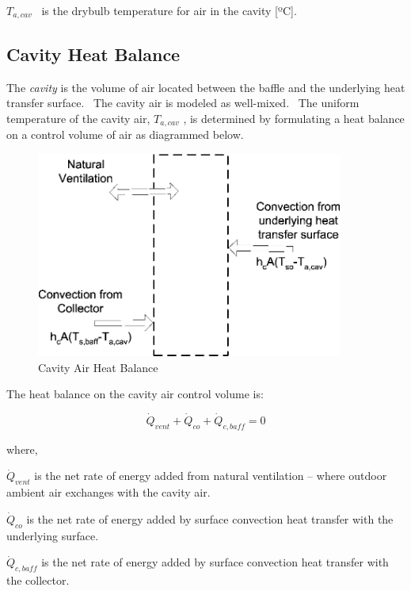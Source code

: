 \({T_{a,cav}}\) ~is the drybulb temperature for air in the cavity {[}ºC{]}.

\subsection{Cavity Heat Balance}\label{cavity-heat-balance}

The \emph{cavity} is the volume of air located between the baffle and the underlying heat transfer surface.~ The cavity air is modeled as well-mixed.~ The uniform temperature of the cavity air, \({T_{a,cav}}\) , is determined by formulating a heat balance on a control volume of air as diagrammed below.

\begin{figure}[hbtp] %
\centering
\includegraphics[width=0.9\textwidth, height=0.9\textheight, keepaspectratio=true]{media/image469.png}
\caption{Cavity Air Heat Balance \protect \label{fig:cavity-air-heat-balance}}
\end{figure}

The heat balance on the cavity air control volume is:

\begin{equation}
{\dot Q_{vent}} + {\dot Q_{co}} + {\dot Q_{c,baff}} = 0
\label{eq:CavityAirCVHeatBalance}
\end{equation}

where,

\(\dot{Q}_{vent}\) is the net rate of energy added from natural ventilation -- where outdoor ambient air exchanges with the cavity air.

\(\dot{Q}_{co}\) is the net rate of energy added by surface convection heat transfer with the underlying surface.

\({\dot Q_{c,baff}}\) is the net rate of energy added by surface convection heat transfer with the collector.

